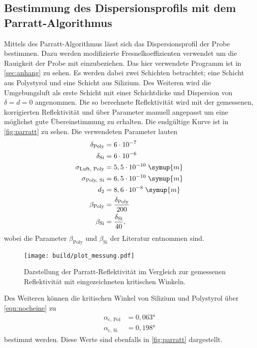 \subsection{Bestimmung des Dispersionsprofils mit dem Parratt-Algorithmus}
Mittels des Parratt-Algorithmus \cite{parratt} lässt sich das Dispersionsprofil der Probe bestimmen.
Dazu werden modifizierte Fresnelkoeffizienten verwendet um die Rauigkeit der Probe mit 
einzubeziehen. Das hier verwendete Programm ist in \autoref{sec:anhang} zu sehen.
Es werden dabei zwei Schichten betrachtet; eine Schicht aus Polystyrol und eine Schicht 
aus Silizium.
Des Weiteren wird die Umgebungsluft als erste Schicht mit einer Schichtdicke und Dispersion 
von $\delta = d = 0$ angenommen.
Die so berechnete Reflektivität wird mit der gemessenen, korrigierten Reflektivität 
und über Parameter manuell angepasst um eine möglichst gute Übereinstimmung zu erhalten. 
Die endgültige Kurve ist in \autoref{fig:parratt} zu sehen. Die verwendeten Parameter lauten
\begin{align*}
    \delta_{\text{Poly}} &= 6 \cdot 10^{-7} \\
    \delta_{\text{Si}} &= 6 \cdot 10^{-6} \\
    \sigma_{\text{Luft, Poly}} &= 5,5 \cdot 10^{-10} \;\symup{m}  \\ 
    \sigma_{\text{Poly, Si}} &= 6,5 \cdot 10^{-10} \;\symup{m}  \\
    d_2 &= 8,6 \cdot 10^{-8} \;\symup{m}\\
    \beta_{\text{Poly}} &= \frac{\delta_{\text{Poly}}}{200}\\
    \beta_{\text{Si}} &= \frac{\delta_{\text{Si}}}{40},
\end{align*}
wobei die Parameter $\beta_{\text{Poly}}$ und $\beta_{\text{Si}}$ der Literatur\cite{parratt} entnommen sind.
\begin{figure}
    \centering
    \texttt{[image: build/plot\_messung.pdf]}
    \caption{Darstellung der Parratt-Reflektivität im Vergleich zur gemessenen Reflektivität mit eingezeichneten kritischen Winkeln.}
    \label{fig:parratt}
\end{figure}
Des Weiteren können die kritischen Winkel von Silizium und Polystyrol über \autoref{eqn:nocheine} zu 
\begin{align*}
    \alpha_{\text{c, Pol}} &= 0,063°\\
    \alpha_{\text{c, Si}} &= 0,198°
\end{align*}
bestimmt werden. Diese Werte sind ebenfalls in \autoref{fig:parratt} dargestellt.